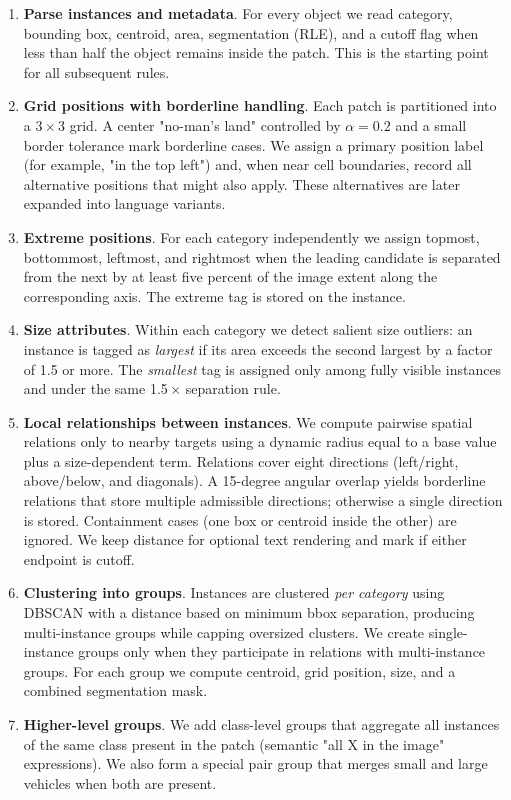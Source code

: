 \begin{enumerate}
    \item \textbf{Parse instances and metadata}. For every object we read category, bounding box, centroid, area, segmentation (RLE), and a cutoff flag when less than half the object remains inside the patch. This is the starting point for all subsequent rules.
    \item \textbf{Grid positions with borderline handling}. Each patch is partitioned into a 3\,\(\times\,\)3 grid. A center "no-man's land" controlled by \(\alpha = 0.2\) and a small border tolerance mark borderline cases. We assign a primary position label (for example, "in the top left") and, when near cell boundaries, record all alternative positions that might also apply. These alternatives are later expanded into language variants.
    \item \textbf{Extreme positions}. For each category independently we assign topmost, bottommost, leftmost, and rightmost when the leading candidate is separated from the next by at least five percent of the image extent along the corresponding axis. The extreme tag is stored on the instance.
    \item \textbf{Size attributes}. Within each category we detect salient size outliers: an instance is tagged as \emph{largest} if its area exceeds the second largest by a factor of 1.5 or more. The \emph{smallest} tag is assigned only among fully visible instances and under the same 1.5\,\(\times\) separation rule.
    \item \textbf{Local relationships between instances}. We compute pairwise spatial relations only to nearby targets using a dynamic radius equal to a base value plus a size-dependent term. Relations cover eight directions (left/right, above/below, and diagonals). A 15-degree angular overlap yields borderline relations that store multiple admissible directions; otherwise a single direction is stored. Containment cases (one box or centroid inside the other) are ignored. We keep distance for optional text rendering and mark if either endpoint is cutoff.
    \item \textbf{Clustering into groups}. Instances are clustered \emph{per category} using DBSCAN with a distance based on minimum bbox separation, producing multi-instance groups while capping oversized clusters. We create single-instance groups only when they participate in relations with multi-instance groups. For each group we compute centroid, grid position, size, and a combined segmentation mask.
    \item \textbf{Higher-level groups}. We add class-level groups that aggregate all instances of the same class present in the patch (semantic "all X in the image" expressions). We also form a special pair group that merges small and large vehicles when both are present.

\end{enumerate}
